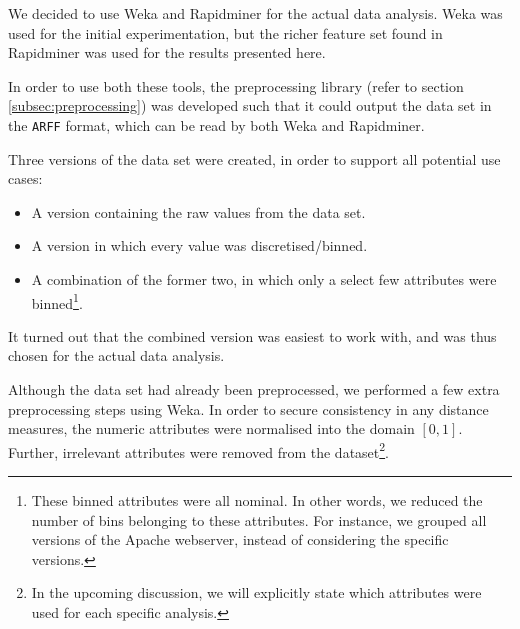 
We decided to use Weka and Rapidminer for the actual data analysis. Weka was used for the initial experimentation, but the richer feature set found in Rapidminer was used for the results presented here. 

In order to use both these tools, the preprocessing library (refer to section \ref{subsec:preprocessing}) was developed such that it could output the data set in the \texttt{ARFF} format, which can be read by both Weka and Rapidminer.

Three versions of the data set were created, in order to support all potential use cases:

\begin{itemize}
\item A version containing the raw values from the data set.
\item A version in which every value was discretised/binned.
\item A combination of the former two, in which only a select few attributes were binned\footnote{These binned attributes were all nominal. In other words, we reduced the number of bins belonging to these attributes. For instance, we grouped all versions of the Apache webserver, instead of considering the specific versions.}.
\end{itemize}

It turned out that the combined version was easiest to work with, and was thus chosen for the actual data analysis.

Although the data set had already been preprocessed, we performed a few extra preprocessing steps using Weka. In order to secure consistency in any distance measures, the numeric attributes were normalised into the domain $[0, 1]$. Further, irrelevant attributes were removed from the dataset\footnote{In the upcoming discussion, we will explicitly state which attributes were used for each specific analysis.}.


